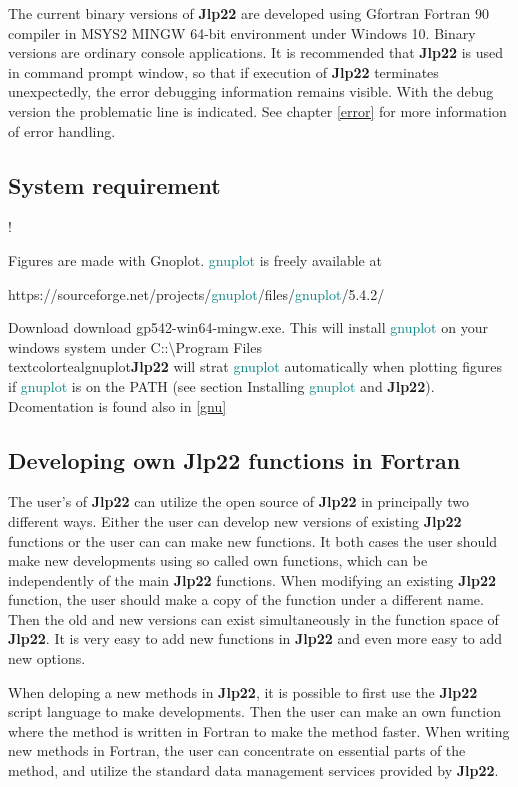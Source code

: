 The current binary versions of \textbf{Jlp22} are developed using Gfortran Fortran 90 compiler in MSYS2 MINGW 64-bit environment 
under Windows 10. 
Binary versions are ordinary console applications. It is recommended that \textbf{Jlp22} is used in command 
prompt window, so that 
if execution of \textbf{Jlp22} terminates unexpectedly, the error debugging information remains visible. 
With the debug version the problematic line is indicated. 
See chapter \ref{error} for more information of error handling. 
 
 
\subsection{System requirement} 
\label{system} 
! 
 
 
Figures are made with Gnoplot. 
\textcolor{teal}{gnuplot} is freely available at 
 
 
https://sourceforge.net/projects/\textcolor{teal}{gnuplot}/files/\textcolor{teal}{gnuplot}/5.4.2/ 
 
Download  download gp542-win64-mingw.exe. This will install \textcolor{teal}{gnuplot} on your windows 
system under C::\textbackslash Program Files\\textcolor{teal}{gnuplot}\. \textbf{Jlp22} will strat \textcolor{teal}{gnuplot} automatically when 
plotting figures if \textcolor{teal}{gnuplot} is on the PATH (see section Installing \textcolor{teal}{gnuplot} and \textbf{Jlp22}). 
Dcomentation is found also in \ref{gnu} 
 
\subsection{Developing own \textbf{Jlp22} functions in Fortran} 
\label{intro2} 
The user's of \textbf{Jlp22} can utilize the open source of \textbf{Jlp22} in principally two different ways. 
Either the user can develop new versions of existing \textbf{Jlp22} functions or the user can can make new functions. 
It both cases the user should make new developments using so called own functions, which can 
be independently of the main \textbf{Jlp22} functions. When modifying an existing \textbf{Jlp22} function, the user should make a copy of the 
function under a different name. Then the old and new versions 
can exist simultaneously in the function 
space of \textbf{Jlp22}. It is very easy to add new functions in \textbf{Jlp22} and even more easy to add new options. 
 
When deloping a new methods in \textbf{Jlp22}, it is possible to first use the \textbf{Jlp22} 
script language to make developments. 
Then the user can make an own function where the method is written in Fortran to make the method faster. 
When writing new methods in Fortran, the user can concentrate on essential parts of the method, and utilize 
the standard data management services provided by \textbf{Jlp22}. 
 
